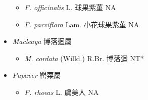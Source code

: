 \begin{itemize}
  \begin{itemize}
        \item[] \textit{F. officinalis} L.  球果紫菫   NA
        \item[] \textit{F. parviflora} Lam.  小花球果紫菫   NA
  \end{itemize}
 \item[] \textit{Macleaya} 博落迴屬
                                
  \begin{itemize}
        \item[] \textit{M. cordata} (Willd.) R.Br.  博落迴   NT*
  \end{itemize}
 \item[] \textit{Papaver} 罌粟屬
                                
  \begin{itemize}
        \item[] \textit{P. rhoeas} L.  虞美人   NA
  \end{itemize}
  \end{itemize}

